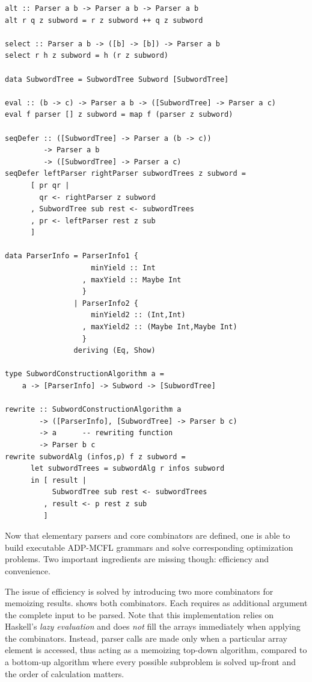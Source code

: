 \documentclass[
    a4paper,
    12pt,
    twoside,
    BCOR=12mm,
    parskip=half,
    chapterprefix,
    numbers=noenddot,
    bibliography=totoc
]{scrbook}
\begin{document}
\begin{lstlisting}[label=lst:combinatorsbasic,caption=Core combinators]
alt :: Parser a b -> Parser a b -> Parser a b
alt r q z subword = r z subword ++ q z subword

select :: Parser a b -> ([b] -> [b]) -> Parser a b
select r h z subword = h (r z subword)

data SubwordTree = SubwordTree Subword [SubwordTree]

eval :: (b -> c) -> Parser a b -> ([SubwordTree] -> Parser a c)
eval f parser [] z subword = map f (parser z subword) 

seqDefer :: ([SubwordTree] -> Parser a (b -> c)) 
         -> Parser a b
         -> ([SubwordTree] -> Parser a c)
seqDefer leftParser rightParser subwordTrees z subword =
      [ pr qr |
        qr <- rightParser z subword
      , SubwordTree sub rest <- subwordTrees
      , pr <- leftParser rest z sub 
      ]

data ParserInfo = ParserInfo1 {
                    minYield :: Int
                  , maxYield :: Maybe Int
                  }
                | ParserInfo2 {
                    minYield2 :: (Int,Int)
                  , maxYield2 :: (Maybe Int,Maybe Int)
                  }
                deriving (Eq, Show)

type SubwordConstructionAlgorithm a = 
    a -> [ParserInfo] -> Subword -> [SubwordTree]
    
rewrite :: SubwordConstructionAlgorithm a
        -> ([ParserInfo], [SubwordTree] -> Parser b c) 
        -> a      -- rewriting function
        -> Parser b c
rewrite subwordAlg (infos,p) f z subword =
      let subwordTrees = subwordAlg r infos subword
      in [ result |
           SubwordTree sub rest <- subwordTrees
         , result <- p rest z sub 
         ]
\end{lstlisting}

Now that elementary parsers and core combinators are defined, one is able to build executable ADP-MCFL grammars and solve corresponding optimization problems. Two important ingredients are missing though: efficiency and convenience.

The issue of efficiency is solved by introducing two more combinators for memoizing results.  shows both combinators. Each requires as additional argument the complete input to be parsed. Note that this implementation relies on Haskell's \emph{lazy evaluation} and does \emph{not} fill the arrays immediately when applying the combinators. Instead, parser calls are made only when a particular array element is accessed, thus acting as a memoizing top-down algorithm, compared to a bottom-up algorithm where every possible subproblem is solved up-front and the order of calculation matters.
\end{document}
